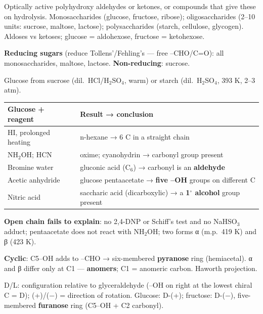 \documentclass[9pt,a4paper]{extarticle}
\begin{document}
\begin{multicols}{2}
\begin{fl}
\item Optically active polyhydroxy aldehydes or ketones, or compounds that give these on hydrolysis. Monosaccharides (glucose, fructose, ribose); oligosaccharides (2--10 units: sucrose, maltose, lactose); polysaccharides (starch, cellulose, glycogen). Aldoses vs ketoses; glucose = aldohexose, fructose = ketohexose.
\item \textbf{Reducing sugars} (reduce Tollens'/Fehling's — free --CHO/C=O): all monosaccharides, maltose, lactose. \textbf{Non-reducing}: sucrose.
\item Glucose from sucrose (dil.\ HCl/H$_2$SO$_4$, warm) or starch (dil.\ H$_2$SO$_4$, 393 K, 2--3 atm).
\end{fl}
{\scriptsize\setlength{\tabcolsep}{2pt}
\begin{tabularx}{\linewidth}{@{}l Y@{}}
\toprule
\textbf{Glucose + reagent} & \textbf{Result → conclusion}\\
\midrule
HI, prolonged heating & n-hexane → 6 C in a straight chain\\
NH$_2$OH; HCN & oxime; cyanohydrin → carbonyl group present\\
Bromine water & gluconic acid (C$_6$) → carbonyl is an \textbf{aldehyde}\\
Acetic anhydride & glucose pentaacetate → \textbf{five --OH} groups on different C\\
Nitric acid & saccharic acid (dicarboxylic) → a \textbf{1$^\circ$ alcohol} group present\\
\bottomrule
\end{tabularx}\par}
\begin{fl}
\item \textbf{Open chain fails to explain}: no 2,4-DNP or Schiff's test and no NaHSO$_3$ adduct; pentaacetate does not react with NH$_2$OH; two forms α (m.p.\ 419 K) and β (423 K).
\item \textbf{Cyclic}: C5--OH adds to --CHO → six-membered \textbf{pyranose} ring (hemiacetal). α and β differ only at C1 — \textbf{anomers}; C1 = anomeric carbon. Haworth projection.
\item D/L: configuration relative to glyceraldehyde (--OH on right at the lowest chiral C = D); (+)/($-$) = direction of rotation. Glucose: D-(+); fructose: D-($-$), five-membered \textbf{furanose} ring (C5--OH + C2 carbonyl).

\end{fl}
\end{multicols}
\end{document}

